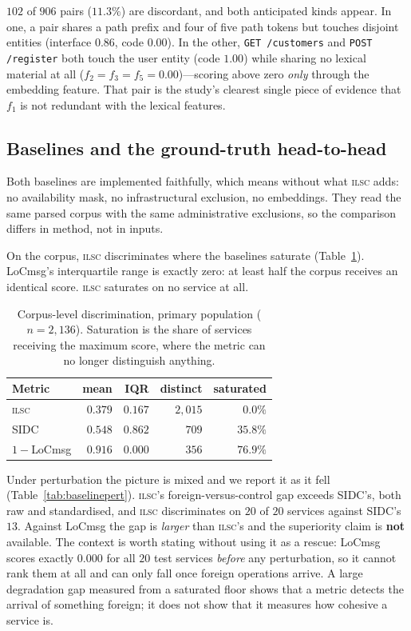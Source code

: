 \documentclass[journal]{IEEEtran}
\newcommand{\ilsc}{\textsc{ilsc}}
\newcommand{\code}[1]{\texttt{\small #1}}
\begin{document}
$102$ of $906$ pairs ($11.3\%$) are discordant, and both anticipated kinds
appear. In one, a pair shares a path prefix and four of five path tokens but
touches disjoint entities (interface $0.86$, code $0.00$). In the other,
\code{GET /customers} and \code{POST /register} both touch the user entity
(code $1.00$) while sharing no lexical material at all
($f_2=f_3=f_5=0.00$)---scoring above zero \emph{only} through the embedding
feature. That pair is the study's clearest single piece of evidence that $f_1$ is
not redundant with the lexical features.

\subsection{Baselines and the ground-truth head-to-head}
\label{sec:res-4b}
Both baselines are implemented faithfully, which means without what \ilsc{}
adds: no availability mask, no infrastructural exclusion, no embeddings. They
read the same parsed corpus with the same administrative exclusions, so the
comparison differs in method, not in inputs.

On the corpus, \ilsc{} discriminates where the baselines saturate
(Table~\ref{tab:baselines}). LoCmsg's interquartile range is exactly zero: at
least half the corpus receives an identical score. \ilsc{} saturates on no
service at all.

\begin{table}[!t]
\caption{Corpus-level discrimination, primary population ($n{=}2{,}136$).
Saturation is the share of services receiving the maximum score, where the
metric can no longer distinguish anything.}
\label{tab:baselines}
\centering
\footnotesize
\begin{tabular}{@{}lrrrr@{}}
\toprule
\textbf{Metric} & \textbf{mean} & \textbf{IQR} & \textbf{distinct} &
\textbf{saturated} \\
\midrule
\ilsc{} & $0.379$ & $\mathbf{0.167}$ & $2{,}015$ & $\mathbf{0.0\%}$ \\
SIDC & $0.548$ & $0.862$ & $709$ & $35.8\%$ \\
$1-$LoCmsg & $0.916$ & $\mathbf{0.000}$ & $356$ & $76.9\%$ \\
\bottomrule
\end{tabular}
\end{table}

Under perturbation the picture is mixed and we report it as it fell
(Table~\ref{tab:baselinepert}). \ilsc{}'s foreign-versus-control gap exceeds
SIDC's, both raw and standardised, and \ilsc{} discriminates on $20$ of $20$
services against SIDC's $13$. Against LoCmsg the gap is \emph{larger} than
\ilsc{}'s and the superiority claim is \textbf{not} available. The context is
worth stating without using it as a rescue: LoCmsg scores exactly $0.000$ for
all $20$ test services \emph{before} any perturbation, so it cannot rank them at
all and can only fall once foreign operations arrive. A large degradation gap
measured from a saturated floor shows that a metric detects the arrival of
something foreign; it does not show that it measures how cohesive a service is.
\end{document}
